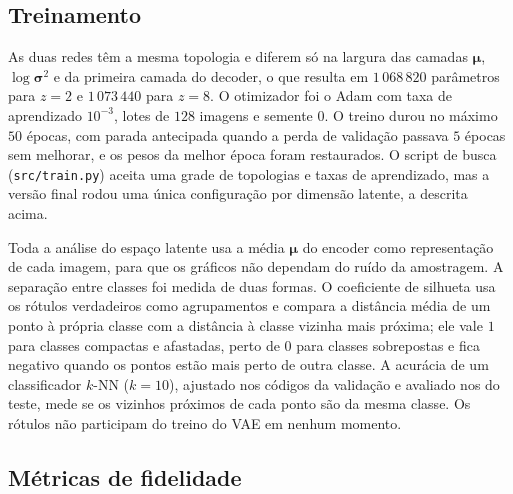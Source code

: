 \documentclass[11pt,a4paper]{article}
\begin{document}
\subsection*{Treinamento}

As duas redes têm a mesma topologia e diferem só na largura das camadas $\boldsymbol{\mu}$, $\log\boldsymbol{\sigma}^2$ e da primeira camada do decoder, o que resulta em $1\,068\,820$ parâmetros para $z = 2$ e $1\,073\,440$ para $z = 8$. O otimizador foi o Adam com taxa de aprendizado $10^{-3}$, lotes de $128$ imagens e semente $0$. O treino durou no máximo $50$ épocas, com parada antecipada quando a perda de validação passava $5$ épocas sem melhorar, e os pesos da melhor época foram restaurados. O script de busca (\texttt{src/train.py}) aceita uma grade de topologias e taxas de aprendizado, mas a versão final rodou uma única configuração por dimensão latente, a descrita acima.

Toda a análise do espaço latente usa a média $\boldsymbol{\mu}$ do encoder como representação de cada imagem, para que os gráficos não dependam do ruído da amostragem. A separação entre classes foi medida de duas formas. O coeficiente de silhueta usa os rótulos verdadeiros como agrupamentos e compara a distância média de um ponto à própria classe com a distância à classe vizinha mais próxima; ele vale $1$ para classes compactas e afastadas, perto de $0$ para classes sobrepostas e fica negativo quando os pontos estão mais perto de outra classe. A acurácia de um classificador $k$-NN ($k = 10$), ajustado nos códigos da validação e avaliado nos do teste, mede se os vizinhos próximos de cada ponto são da mesma classe. Os rótulos não participam do treino do VAE em nenhum momento.

\subsection*{Métricas de fidelidade}
\end{document}
